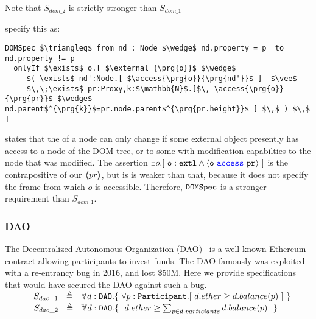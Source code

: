 Note that $S_{dom\_2}$ is strictly stronger than $S_{dom\_1}$

\vspace{.1cm}

\citet{OOPSLA22} specify this as:
 
 \begin{lstlisting}[language = Chainmail, mathescape=true, frame=lines]
DOMSpec $\triangleq$ from nd : Node $\wedge$ nd.property = p  to nd.property != p
  onlyIf $\exists$ o.[ $\external {\prg{o}}$ $\wedge$ 
     $( \exists$ nd':Node.[ $\access{\prg{o}}{\prg{nd'}}$ ]  $\vee$ 
     $\,\;\exists$ pr:Proxy,k:$\mathbb{N}$.[$\, \access{\prg{o}}{\prg{pr}}$ $\wedge$ nd.parent$^{\prg{k}}$=pr.node.parent$^{\prg{pr.height}}$ ] $\,$ ) $\,$ ]
\end{lstlisting}

 states that the  of a node can only change if
some external object presently has 
access to a node of the DOM tree, or to some  with modification-capabilties
to the node that was modified.
The assertion $\exists {o}.[\ \mbox{\normalfont{\texttt{o}}}:\mbox{\normalfont{\texttt{extl}}} \wedge \langle \mbox{\normalfont{\texttt{o}}}\ {\color{blue}\texttt{access}}\ \mbox{\normalfont{\texttt{pr}}} \rangle\ ]$ is the contrapositive of our  $\langle\!\!\langle pr \rangle\!\!\rangle$, but is is weaker than that, because it does not specify the frame from which $o$ is accessible.
Therefore, $\mbox{\normalfont{\texttt{DOMSpec}}}$ is a stronger requirement than $S_{dom\_1}$.

\subsubsection{DAO}
The Decentralized Autonomous Organization (DAO)~\cite{Dao}  is a well-known Ethereum contract allowing 
participants to invest funds. The DAO famously was exploited with a re-entrancy bug in 2016, 
and lost \$50M. Here we provide specifications that would have secured the DAO against such a 
bug. 
\\ 
$\strut \SPSP  S_{dao\_1}\ \  \triangleq \ \ \TwoStatesN{ d:\prg{DAO}}{\ \forall p:\prg{Participant}. [\ d.ether \geq d.balance(p) \ ]   \ }$ 
\\
$\strut \SPSP  S_{dao\_2}\ \  \triangleq \ \ \TwoStatesN{ d:\prg{DAO}}{\ \ d.ether \geq \sum_{p \in d.particiants} d.balance(p)\  \ }$ 


